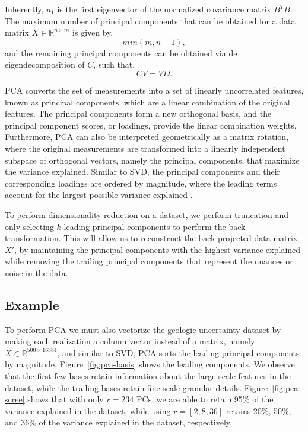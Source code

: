 \documentclass[a4paper,fleqn,12pt]{article}
\begin{document}
Inherently, $u_1$ is the first eigenvector of the normalized covariance matrix $B^TB$. The maximum number of principal components that can be obtained for a data matrix $X\in\mathbb{R}^{n\times m}$ is given by,
\begin{equation}
    min(m,n-1) ,
\end{equation}
and the remaining principal components can be obtained via de eigendecomposition of $C$, such that,
\begin{equation}
    CV = VD .
\end{equation}

PCA converts the set of measurements into a set of linearly uncorrelated features, known as principal components, which are a linear combination of the original features. The principal components form a new orthogonal basis, and the principal component scores, or loadings, provide the linear combination weights. Furthermore, PCA can also be interpreted geometrically as a matrix rotation, where the original measurements are transformed into a linearly independent subspace of orthogonal vectors, namely the principal components, that maximize the variance explained. Similar to SVD, the principal components and their corresponding loadings are ordered by magnitude, where the leading terms account for the largest possible variance explained \cite{esbensen20202}. 

To perform dimensionality reduction on a dataset, we perform truncation and only selecting $k$ leading principal components to perform the back-transformation. This will allow us to reconstruct the back-projected data matrix, $X'$, by maintaining the principal components with the highest variance explained while removing the trailing principal components that represent the nuances or noise in the data.


\subsection*{Example}
To perform PCA we must also vectorize the geologic uncertainty dataset by making each realization a column vector instead of a matrix, namely $X\in\mathbb{R}^{500\times16384}$, and similar to SVD, PCA sorts the leading principal components by magnitude. Figure~\ref{fig:pca-basis} shows the leading components. We observe that the first few bases retain information about the large-scale features in the dataset, while the trailing bases retain fine-scale granular details. Figure~\ref{fig:pca-scree} shows that with only $r=234$ PCs, we are able to retain 95\% of the variance explained in the dataset, while using $r=[2,8,36]$ retains 20\%, 50\%, and 36\% of the variance explained in the dataset, respectively.
\end{document}
